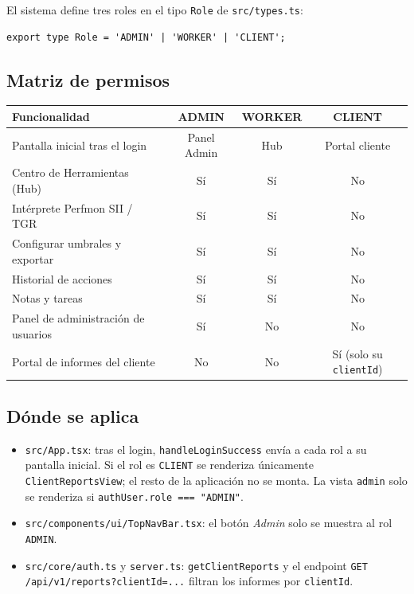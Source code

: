 \documentclass[11pt,a4paper]{article}
\newcommand{\ruta}[1]{\texttt{#1}}
\begin{document}
El sistema define tres roles en el tipo \texttt{Role} de \ruta{src/types.ts}:

\begin{lstlisting}
export type Role = 'ADMIN' | 'WORKER' | 'CLIENT';
\end{lstlisting}

\subsection{Matriz de permisos}
\begin{center}
\begin{tabularx}{\linewidth}{Xccc}
\toprule
\textbf{Funcionalidad} & \textbf{ADMIN} & \textbf{WORKER} & \textbf{CLIENT} \\
\midrule
Pantalla inicial tras el login      & Panel Admin & Hub & Portal cliente \\
Centro de Herramientas (Hub)        & Sí & Sí & No \\
Intérprete Perfmon SII / TGR        & Sí & Sí & No \\
Configurar umbrales y exportar      & Sí & Sí & No \\
Historial de acciones               & Sí & Sí & No \\
Notas y tareas                      & Sí & Sí & No \\
Panel de administración de usuarios & Sí & No & No \\
Portal de informes del cliente      & No & No & Sí (solo su \texttt{clientId}) \\
\bottomrule
\end{tabularx}
\end{center}

\subsection{Dónde se aplica}
\begin{itemize}[leftmargin=*]
  \item \ruta{src/App.tsx}: tras el login, \texttt{handleLoginSuccess} envía a cada rol a su
        pantalla inicial. Si el rol es \texttt{CLIENT} se renderiza únicamente
        \texttt{ClientReportsView}; el resto de la aplicación no se monta. La vista
        \texttt{admin} solo se renderiza si \texttt{authUser.role === "ADMIN"}.
  \item \ruta{src/components/ui/TopNavBar.tsx}: el botón \emph{Admin} solo se muestra
        al rol \texttt{ADMIN}.
  \item \ruta{src/core/auth.ts} y \ruta{server.ts}: \texttt{getClientReports} y el endpoint
        \texttt{GET /api/v1/reports?clientId=...} filtran los informes por \texttt{clientId}.
\end{itemize}
\end{document}
